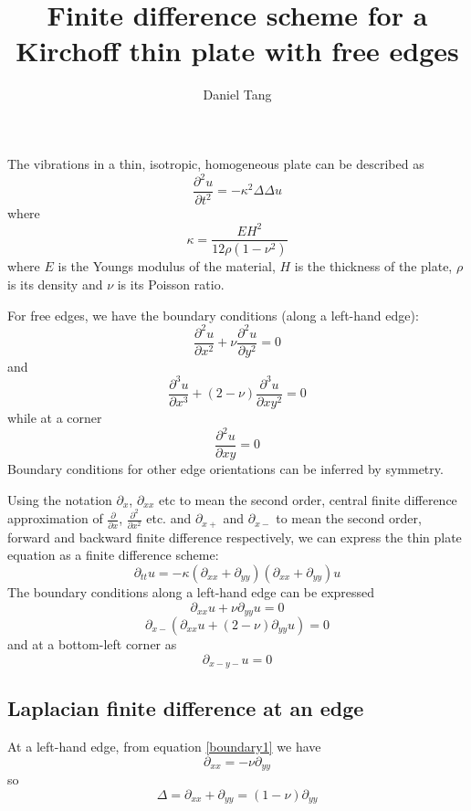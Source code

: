 \documentclass[a4paper]{article}
\title{Finite difference scheme for a Kirchoff thin plate with free edges}
\author{Daniel Tang}
\begin{document}
\maketitle
The vibrations in a thin, isotropic, homogeneous plate can be described as
\[
\frac{\partial^2 u}{\partial t^2} = -\kappa^2 \Delta \Delta u
\]
where
\[
\kappa = \frac{EH^2}{12\rho(1-\nu^2)}
\]
where $E$ is the Youngs modulus of the material, $H$ is the thickness of the plate, $\rho$ is its density and $\nu$ is its Poisson ratio.

For free edges, we have the boundary conditions (along a left-hand edge):
\[
\frac{\partial^2u}{\partial x^2} + \nu \frac{\partial^2u}{\partial y^2} = 0
\]
and
\[
\frac{\partial^3u}{\partial x^3} + (2-\nu) \frac{\partial^3u}{\partial xy^2} = 0
\]
while at a corner
\[
\frac{\partial^2u}{\partial xy} = 0
\]
Boundary conditions for other edge orientations can be inferred by symmetry.

Using the notation $\partial_x$, $\partial_{xx}$ etc to mean the second order, central finite difference approximation of $\frac{\partial}{\partial x}$, $\frac{\partial^2}{\partial x^2}$ etc. and $\partial_{x+}$ and $\partial_{x-}$ to mean the second order, forward and backward finite difference respectively, we can express the thin plate equation as a finite difference scheme:
\[
\partial_{tt} u = -\kappa (\partial_{xx} + \partial_{yy})(\partial_{xx} + \partial_{yy})u
\]
The boundary conditions along a left-hand edge can be expressed
\begin{equation}
\partial_{xx}u + \nu \partial_{yy}u = 0
\label{boundary1}
\end{equation}
\begin{equation}
\partial_{x-}(\partial_{xx}u + (2-\nu)\partial_{yy}u) = 0
\label{boundary2}
\end{equation}
and at a bottom-left corner as
\begin{equation}
\partial_{x-y-}u = 0
\label{boundarycorner}
\end{equation}

\subsection{Laplacian finite difference at an edge}
At a left-hand edge, from equation \ref{boundary1} we have
\[
\partial_{xx} = - \nu \partial_{yy} 
\]
so
\begin{equation}
\Delta = \partial_{xx} + \partial_{yy} = (1-\nu)\partial_{yy}
\label{delta}
\end{equation}
\end{document}
